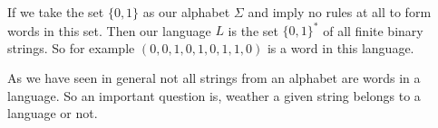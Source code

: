 \begin{example} If we take the set $\{0,1\}$ as our alphabet $\Sigma$ and imply no rules at all to form words in this set. Then our language $L$ is the set $\{0,1\}^*$ of all finite binary strings. So for example $(0,0,1,0,1,0,1,1,0)$ is a word in this language.
\end{example}

\begin{example}
\end{example}

\begin{example}[Compiler]
\end{example}



As we have seen in general not all strings from an alphabet are words in a language. So an important question is, weather a given string belongs to a language or not. 

